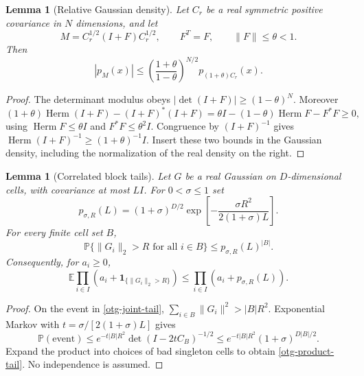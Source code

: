 \documentclass[11pt]{article}
\newtheorem{lemma}[theorem]{Lemma}
\begin{document}
\begin{lemma}[Relative Gaussian density]\label{otg-density-lemma}
Let $C_r$ be a real symmetric positive covariance in $N$
dimensions, and let
\[
 M=C_r^{1/2}(I+F)C_r^{1/2},\qquad F^T=F,\qquad
                       \|F\|\le\theta<1.
\]
Then
\begin{equation}\label{otg-density}
 |p_M(x)|
 \le\left(\frac{1+\theta}{1-\theta}\right)^{N/2}
                                p_{(1+\theta)C_r}(x).
\end{equation}
\end{lemma}
\begin{proof}
The determinant modulus obeys
$|\det(I+F)|\ge(1-\theta)^N$. Moreover
\[
 (1+\theta)\operatorname{Herm}(I+F)-(I+F)^*(I+F)
 =\theta I-(1-\theta)\operatorname{Herm}F-F^*F\ge0,
\]
using $\operatorname{Herm}F\le\theta I$ and
$F^*F\le\theta^2I$.
Congruence by $(I+F)^{-1}$ gives
$\operatorname{Herm}(I+F)^{-1}\ge(1+\theta)^{-1}I$.
Insert these two bounds in the Gaussian density, including
the normalization of the real density on the right.
\end{proof}

\begin{lemma}[Correlated block tails]\label{otg-tail-lemma}
Let $G$ be a real Gaussian on $D$-dimensional cells, with
covariance at most $L I$. For $0<\sigma\le1$ set
\begin{equation}\label{otg-tail-constant}
 p_{\sigma,R}(L)
  =(1+\sigma)^{D/2}
             \exp\left[-\frac{\sigma R^2}{2(1+\sigma)L}\right].
\end{equation}
For every finite cell set $B$,
\begin{equation}\label{otg-joint-tail}
 \mathbb P\{\|G_i\|_2>R\text{ for all }i\in B\}
                   \le p_{\sigma,R}(L)^{|B|}.
\end{equation}
Consequently, for $a_i\ge0$,
\begin{equation}\label{otg-product-tail}
 \mathbb E\prod_{i\in I}
            (a_i+\mathbf1_{\{\|G_i\|_2>R\}})
                  \le\prod_{i\in I}(a_i+p_{\sigma,R}(L)).
\end{equation}
\end{lemma}
\begin{proof}
On the event in \eqref{otg-joint-tail},
$\sum_{i\in B}\|G_i\|^2>|B|R^2$.
Exponential Markov with
$t=\sigma/[2(1+\sigma)L]$ gives
\[
 \mathbb P(\text{event})
 \le e^{-t|B|R^2}\det(I-2tC_B)^{-1/2}
 \le e^{-t|B|R^2}(1+\sigma)^{D|B|/2}.
\]
Expand the product into choices of bad singleton cells to
obtain \eqref{otg-product-tail}. No independence is assumed.
\end{proof}
\end{document}
